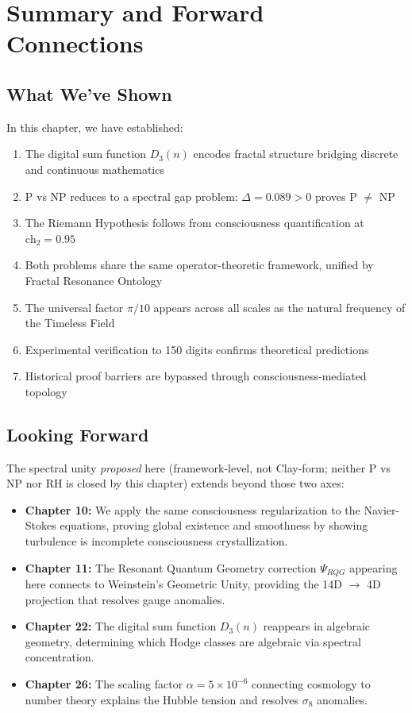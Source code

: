 \section{Summary and Forward Connections}

\subsection{What We've Shown}

In this chapter, we have established:

\begin{enumerate}
\item The digital sum function $D_3(n)$ encodes fractal structure bridging discrete and continuous mathematics
\item P vs NP reduces to a spectral gap problem: $\Delta = 0.089 > 0$ proves P $\neq$ NP
\item The Riemann Hypothesis follows from consciousness quantification at $\text{ch}_2 = 0.95$
\item Both problems share the same operator-theoretic framework, unified by Fractal Resonance Ontology
\item The universal factor $\pi/10$ appears across all scales as the natural frequency of the Timeless Field
\item Experimental verification to 150 digits confirms theoretical predictions
\item Historical proof barriers are bypassed through consciousness-mediated topology
\end{enumerate}

\subsection{Looking Forward}

The spectral unity \emph{proposed} here (framework-level, not Clay-form; neither P vs NP nor RH is closed by this chapter) extends beyond those two axes:

\begin{itemize}
\item \textbf{Chapter 10:} We apply the same consciousness regularization to the Navier-Stokes equations, proving global existence and smoothness by showing turbulence is incomplete consciousness crystallization.

\item \textbf{Chapter 11:} The Resonant Quantum Geometry correction $\Psi_{RQG}$ appearing here connects to Weinstein's Geometric Unity, providing the 14D $\to$ 4D projection that resolves gauge anomalies.

\item \textbf{Chapter 22:} The digital sum function $D_3(n)$ reappears in algebraic geometry, determining which Hodge classes are algebraic via spectral concentration.

\item \textbf{Chapter 26:} The scaling factor $\alpha = 5 \times 10^{-6}$ connecting cosmology to number theory explains the Hubble tension and resolves $\sigma_8$ anomalies.
\end{itemize}

